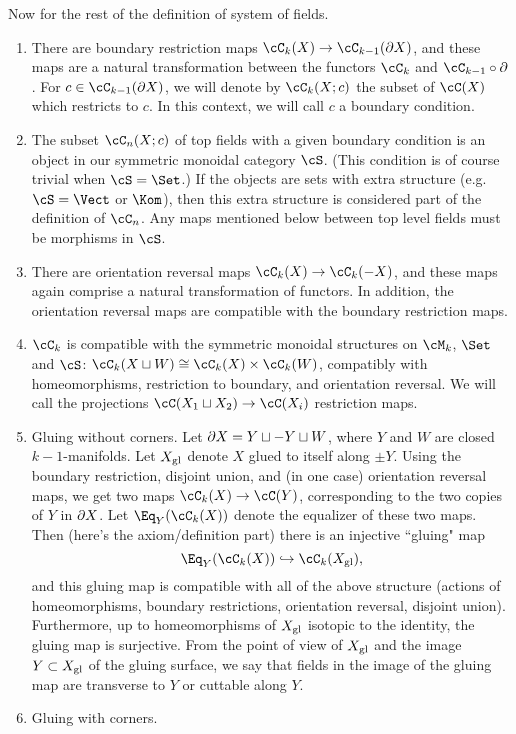 \documentclass[11pt,leqno]{amsart}
\begin{document}
Now for the rest of the definition of system of fields.
\begin{enumerate}
\item There are boundary restriction maps $\cC_k(X) \to \cC_{k-1}(\bd X)$, 
and these maps are a natural
transformation between the functors $\cC_k$ and $\cC_{k-1}\circ\bd$.
For $c \in \cC_{k-1}(\bd X)$, we will denote by $\cC_k(X; c)$ the subset of 
$\cC(X)$ which restricts to $c$.
In this context, we will call $c$ a boundary condition.
\item The subset $\cC_n(X;c)$ of top fields with a given boundary condition is an object in our symmetric monoidal category $\cS$. (This condition is of course trivial when $\cS = \Set$.) If the objects are sets with extra structure (e.g. $\cS = \Vect$ or $\Kom$), then this extra structure is considered part of the definition of $\cC_n$. Any maps mentioned below between top level fields must be morphisms in $\cS$.
\item There are orientation reversal maps $\cC_k(X) \to \cC_k(-X)$, and these maps
again comprise a natural transformation of functors.
In addition, the orientation reversal maps are compatible with the boundary restriction maps.
\item $\cC_k$ is compatible with the symmetric monoidal
structures on $\cM_k$, $\Set$ and $\cS$: $\cC_k(X \du W) \cong \cC_k(X)\times \cC_k(W)$,
compatibly with homeomorphisms, restriction to boundary, and orientation reversal.
We will call the projections $\cC(X_1 \du X_2) \to \cC(X_i)$
restriction maps.
\item Gluing without corners.
Let $\partial X = Y \sqcup -Y \sqcup W$, where $Y$ and $W$ are closed $k{-}1$-manifolds.
Let $X_\mathrm{gl}$ denote $X$ glued to itself along $\pm Y$.
Using the boundary restriction, disjoint union, and (in one case) orientation reversal
maps, we get two maps $\cC_k(X) \to \cC(Y)$, corresponding to the two
copies of $Y$ in $\partial X$.
Let $\Eq_Y(\cC_k(X))$ denote the equalizer of these two maps.
Then (here's the axiom/definition part) there is an injective ``gluing" map
\[
	\Eq_Y(\cC_k(X)) \hookrightarrow \cC_k(X\sgl) ,
\]
and this gluing map is compatible with all of the above structure (actions
of homeomorphisms, boundary restrictions, orientation reversal, disjoint union).
Furthermore, up to homeomorphisms of $X_\mathrm{gl}$ isotopic to the identity,
the gluing map is surjective.
From the point of view of $X_\mathrm{gl}$ and the image $Y \subset X_\mathrm{gl}$ of the 
gluing surface, we say that fields in the image of the gluing map
are transverse to $Y$ or cuttable along $Y$.
\item Gluing with corners.

\end{enumerate}
\end{document}
